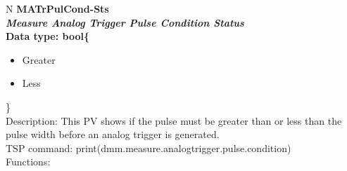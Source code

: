 \documentclass[openany]{article}
\begin{document}
		\begin{tabular}{N}
			\hline
			\bfseries MATrPulCond-Sts\label{pv:matrpulcond-sts} \\ \hline
			\emph{Measure Analog Trigger Pulse Condition Status} \\
			Data type: bool\{\begin{itemize}[noitemsep]
				\small
				\item[] Greater
				\item[] Less
			\end{itemize}\} \\
			Description: This PV shows if the pulse must be greater than or less than the pulse width before an analog trigger is generated. \\
			TSP command: print(dmm.measure.analogtrigger.pulse.condition) \\
			Functions: \\
			\arrayrulecolor{\FuncTableBorderColor}

		\end{tabular}
\end{document}

